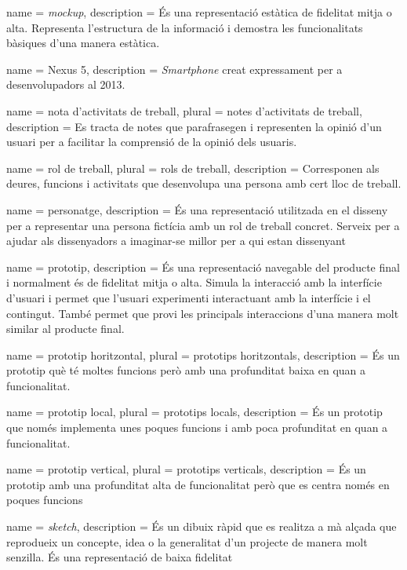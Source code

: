 {
name = \textit{mockup}, description = {És una representació estàtica de fidelitat mitja o alta.  Representa l'estructura de la informació i demostra les funcionalitats bàsiques d'una manera estàtica.}
}

{
name = Nexus 5, description = {\textit{Smartphone} creat expressament per a desenvolupadors al 2013.}  
}

{
name = nota d'activitats de treball, plural = notes d'activitats de treball, description = {Es tracta de notes que parafrasegen i representen la opinió d'un usuari per a facilitar la comprensió de la opinió dels usuaris.}  
}

{
name = rol de treball, plural = rols de treball, description = {Corresponen als deures, funcions i activitats que desenvolupa una persona amb cert lloc de treball.}  
}

{
name = personatge, description = {És una representació utilitzada en el disseny per a representar una persona fictícia amb un rol de treball concret. Serveix per a ajudar als dissenyadors a imaginar-se millor per a qui estan dissenyant}  
}

{
name = prototip, description = {És una representació navegable del producte final i normalment és de fidelitat mitja o alta. Simula la interacció amb la interfície d'usuari i permet que l'usuari experimenti interactuant amb la interfície i el contingut. També permet que provi les principals interaccions d'una manera molt similar al producte final.}
}

{
name = prototip horitzontal, plural = prototips horitzontals, description = {És un prototip què té moltes funcions però amb una profunditat baixa en quan a funcionalitat.}
}

{
name = prototip local, plural = prototips locals, description = {És un prototip que només implementa unes poques funcions i amb poca profunditat en quan a funcionalitat.}
}

{
name = prototip vertical, plural = prototips verticals, description = {És un prototip amb una profunditat alta de funcionalitat però que es centra només en poques funcions}
}

{
name = \textit{sketch}, description = {És un dibuix ràpid que es realitza a mà alçada que reprodueix un concepte, idea o la generalitat d'un projecte de manera molt senzilla. És una representació de baixa fidelitat} 
}

